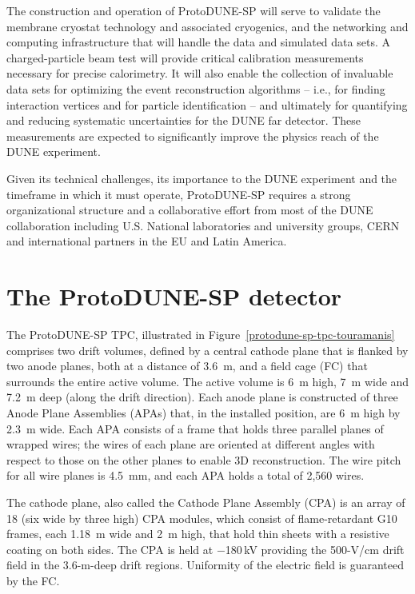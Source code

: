 The construction and operation of ProtoDUNE-SP will serve to validate the membrane cryostat technology and associated cryogenics, and the networking and computing infrastructure that will handle the data and simulated data sets.
A charged-particle beam test will provide critical calibration measurements necessary for precise calorimetry. It will also enable the collection of invaluable data sets for optimizing the event reconstruction algorithms -- i.e., for finding interaction vertices and for particle identification -- and ultimately for quantifying and reducing systematic uncertainties for the DUNE far detector. These measurements are expected to significantly improve the physics reach of the DUNE experiment.

Given its technical challenges, its importance to the DUNE experiment and the timeframe in which it must operate, ProtoDUNE-SP requires a strong organizational structure and a collaborative effort from most of the DUNE collaboration including U.S. National laboratories and university groups, CERN and international partners in the EU and Latin America. 


\section{The ProtoDUNE-SP detector}

The ProtoDUNE-SP TPC, illustrated in Figure~\ref{protodune-sp-tpc-touramanis} comprises two drift volumes, defined by  a central cathode plane that is flanked by two anode planes, both at a distance of 3.6~m, and a field cage (FC) that surrounds the entire active volume. The active volume is 6~m high, 7~m wide and 7.2~m deep (along the drift direction).
Each anode plane is constructed of three Anode Plane Assemblies (APAs) that, in the installed position, are  6~m high by 2.3~m wide. Each APA consists of a frame that holds three parallel planes of wrapped wires; the wires of each plane are
oriented at different angles with respect to those on the other planes to enable 3D reconstruction.  The wire pitch for all wire planes is 4.5~mm, and each APA holds a total of 2,560 wires. 

The cathode plane, also called the Cathode Plane Assembly (CPA) is an array of 18 (six wide by three high) CPA modules, which consist of flame-retardant G10 frames, each 1.18~m wide and 2~m high, that hold thin sheets with a resistive coating on both sides. 
The CPA is held at $-$180\,kV providing the 500-V/cm drift field in the 3.6-m-deep drift regions. 
Uniformity of the electric field is guaranteed by the FC.
 
